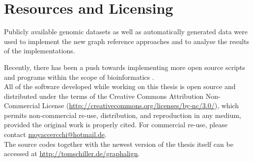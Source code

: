 \documentclass[a4paper,12pt,twoside,BCOR=10mm]{scrbook}
\begin{document}
\section{Resources and Licensing}
%

Publicly available genomic datasets as well as automatically generated data were used 
to implement the new graph reference approaches and to analyse the results of the implementations.

Recently, there has been a push towards implementing more open source scripts 
and programs within the scope of bioinformatics \citep{MANIFESTO}. \\
All of the software developed while working on this thesis 
is open source and distributed under the terms of 
the Creative Commons Attribution Non-Commercial License 
(\url{http://creativecommons.org/licenses/by-nc/3.0/}), 
which permits non-commercial re-use, distribution, and reproduction in any medium, 
provided the original work is properly cited. 
For commercial re-use, please contact \url{moyaccercchi@hotmail.de}. \\
The source codes together with the newest version of the thesis itself can be accessed at \url{http://tomschiller.de/graphalign}.
% 

%
%
%
%
\end{document}
